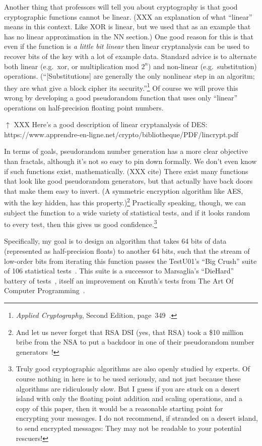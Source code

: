 \documentclass[twocolumn]{article}
\begin{document}
Another thing that professors will tell you about cryptography is that
good cryptographic functions cannot be linear. (XXX an explanation of
what ``linear'' means in this context. Like XOR is linear, but we used
that as an example that has no linear approximation in the NN
section.) One good reason for this is that even if the function is
{\em a little bit linear} then linear cryptanalysis can be used to recover
bits of the key with a lot of example data. Standard advice is to
alternate both linear (e.g.~xor, or multiplication mod $2^n$) and
non-linear (e.g.~substitution) operations. (``[Substitutions] are
generally the only nonlinear step in an algoritm; they are what give a
block cipher its security.''\footnote{{\it Applied Cryptography},
  Second Edition, page~349~\cite{schneier1996applied}.} Of course we
will prove this wrong by developing a good pseudorandom function that
uses only ``linear'' operations on half-precision floating point
numbers.

$\uparrow$ XXX Here's a good description of linear cryptanalysis of DES: https://www.apprendre-en-ligne.net/crypto/bibliotheque/PDF/lincrypt.pdf

In terms of goals, pseudorandom number generation has a more clear
objective than fractals, although it's not so easy to pin down
formally. We don't even know if such functions exist, mathematically.
(XXX cite) There exist many functions that look like good pseudorandom
generators, but that actually have back doors that make them easy to
invert. (A symmetric encryption algorithm like AES, with the key
hidden, has this property.)\footnote{And let us never forget that RSA
  DSI (yes, that RSA) took a \$10 million bribe from the NSA to put a
  backdoor in one of their pseudorandom number
  generators~\cite{reuters2013secret}!} Practically speaking, though,
we can subject the function to a wide variety of statistical tests,
and if it looks random to every test, then this gives us good
confidence.\footnote{Truly good cryptographic algorithms are also
  openly studied by experts. Of course nothing in here is to be used
  seriously, and not just because these algorithms are ridiculously
  slow. But I guess if you are stuck on a desert island with only the
  floating point addition and scaling operations, and a copy of this
  paper, then it would be a reasonable starting point for encrypting
  your messages. I do not recommend, if stranded on a desert island,
  to send encrypted messages: They may not be readable to your
  potential rescuers!}

Specifically, my goal is to design an algorithm that takes 64 bits of
data (represented as half-precision floats) to another 64 bits, such
that the stream of low-order bits from iterating this function passes
the TestU01's ``Big Crush'' suite of 106 statistical
tests~\cite{lecuyer2007testu01}. This suite is a successor to
Marsaglia's ``DieHard'' battery of tests~\cite{marsaglia1996diehard},
itself an improvement on Knuth's tests from The Art Of Computer
Programming~\cite{knuth1997art}.
\end{document}
